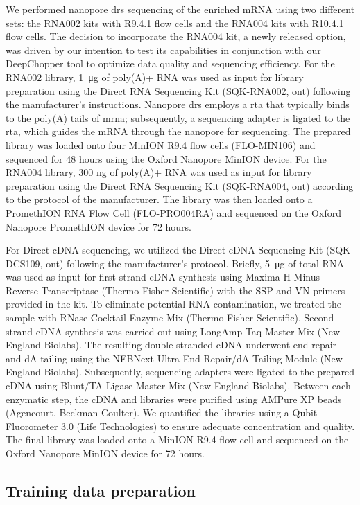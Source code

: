 \documentclass[pdflatex,sn-nature, lineno]{sn-jnl}%
\begin{document}
We performed nanopore \gls{drs} sequencing of the enriched mRNA using two different sets: the RNA002 kits with R9.4.1 flow cells and the RNA004 kits with R10.4.1 flow cells.
The decision to incorporate the RNA004 kit, a newly released option, was driven by our intention to test its capabilities in conjunction with our DeepChopper tool to optimize data quality and sequencing efficiency.
For the RNA002 library, \SI{1}{\micro\gram} of poly(A)+ RNA was used as input for library preparation using the Direct RNA Sequencing Kit (SQK-RNA002, \gls{ont}) following the manufacturer's instructions.
Nanopore \gls{drs} employs a \gls{rta} that typically binds to the poly(A) tails of \gls{mrna}; subsequently, a sequencing adapter is ligated to the \gls{rta}, which guides the mRNA through the nanopore for sequencing.
The prepared library was loaded onto four MinION R9.4 flow cells (FLO-MIN106) and sequenced for 48 hours using the Oxford Nanopore MinION device.
For the RNA004 library, 300 ng of poly(A)+ RNA was used as input for library preparation using the Direct RNA Sequencing Kit (SQK-RNA004, \gls{ont}) according to the protocol of the manufacturer.
The library was then loaded onto a PromethION RNA Flow Cell (FLO-PRO004RA) and sequenced on the Oxford Nanopore PromethION device for 72 hours.

For Direct cDNA sequencing, we utilized the Direct cDNA Sequencing Kit (SQK-DCS109, \gls{ont}) following the manufacturer's protocol.
Briefly, \SI{5}{\micro\gram}  of total RNA was used as input for first-strand cDNA synthesis using Maxima H Minus Reverse Transcriptase (Thermo Fisher Scientific) with the SSP and VN primers provided in the kit.
To eliminate potential RNA contamination, we treated the sample with RNase Cocktail Enzyme Mix (Thermo Fisher Scientific).
Second-strand cDNA synthesis was carried out using LongAmp Taq Master Mix (New England Biolabs).
The resulting double-stranded cDNA underwent end-repair and dA-tailing using the NEBNext Ultra End Repair/dA-Tailing Module (New England Biolabs).
Subsequently, sequencing adapters were ligated to the prepared cDNA using Blunt/TA Ligase Master Mix (New England Biolabs).
Between each enzymatic step, the cDNA and libraries were purified using AMPure XP beads (Agencourt, Beckman Coulter).
We quantified the libraries using a Qubit Fluorometer 3.0 (Life Technologies) to ensure adequate concentration and quality.
The final library was loaded onto a MinION R9.4 flow cell and sequenced on the Oxford Nanopore MinION device for 72 hours.

\subsection{Training data preparation}\label{ssec:data}
\end{document}

